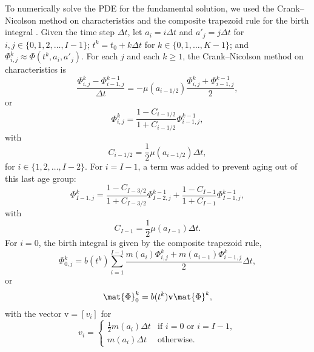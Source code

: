 \documentclass{jpmarticle}
\renewcommand{\vec}[1]{\boldsymbol{\mathrm{#1}}}
\begin{document}
To numerically solve the PDE for the fundamental solution, we used the
Crank--Nicolson method on characteristics and the composite trapezoid
rule for the birth integral \autocite{milner_1992}.  Given the time
step $\Delta t$, let $a_i = i \Delta t$ and $a'_j = j \Delta t$ for
$i, j \in \{0, 1, 2, \ldots, I - 1\}$;
$t^k = t_0 + k \Delta t$ for $k \in \{0, 1, \ldots, K - 1\}$;
and $\Phi_{i, j}^k \approx \Phi(t^k, a_i, a'_j)$.
For each $j$ and each $k \geq 1$, the Crank--Nicolson method on
characteristics is
\begin{equation}
  \label{CN_step}
  \frac{\Phi_{i, j}^k - \Phi_{i - 1, j}^{k - 1}}{\Delta t}
  = - \mu(a_{i - 1 / 2})
  \frac{\Phi_{i, j}^k + \Phi_{i - 1, j}^{k - 1}}{2},
\end{equation}
or
\begin{equation}
  \Phi_{i, j}^k
  = \frac{1 - C_{i - 1 / 2}}{1 + C_{i - 1 / 2}}
  \Phi_{i - 1, j}^{k - 1},
\end{equation}
with
\begin{equation}
  C_{i - 1 / 2}
  = \frac{1}{2} \mu(a_{i - 1 / 2}) \Delta t,
\end{equation}
for $i \in \{1, 2, \ldots, I - 2\}$.  For $i = I - 1$,
a term was added to prevent aging out of this
last age group:
\begin{equation}
  \Phi_{I - 1, j}^k
  = \frac{1 - C_{I - 3 / 2}}{1 + C_{I - 3 / 2}}
  \Phi_{I - 2, j}^{k - 1}
  + \frac{1 - C_{I - 1}}{1 + C_{I - 1}}
  \Phi_{I - 1, j}^{k - 1},
\end{equation}
with
\begin{equation}
  C_{I - 1}
  = \frac{1}{2} \mu(a_{I - 1}) \Delta t.
\end{equation}
For $i = 0$, the birth integral is given by the composite trapezoid rule,
\begin{equation}
  \label{birth_step}
  \Phi_{0, j}^k =
  b(t^k)
  \sum_{i = 1}^{I - 1}
  \frac{m(a_i) \Phi_{i, j}^k
    + m(a_{i - 1}) \Phi_{i - 1, j}^k}{2}
  \Delta t,
\end{equation}
or
\begin{equation}
  \mat{\Phi}_0^k = b(t^k) \vec{v} \mat{\Phi}^k,
\end{equation}
with the vector $\vec{v} = [v_i]$ for
\begin{equation}
  v_i =
  \begin{cases}
    \frac{1}{2} m(a_i) \Delta t
    & \text{if $i = 0$ or $i = I - 1$}, \\
    m(a_i) \Delta t
    & \text{otherwise}.
  \end{cases}
\end{equation}
\end{document}
